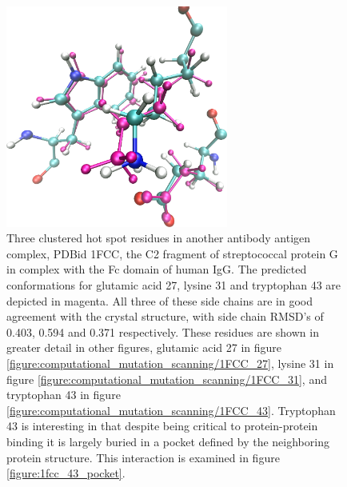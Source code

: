 \begin{figure}[h]
  \centering
  \includegraphics[width=0.65\textwidth,height=0.3\textheight,keepaspectratio]{figures/mutation_side_chain_images/1fcc_27_31_43.png}
  \caption{Three clustered hot spot residues in another antibody antigen complex, PDBid 1FCC, the C2 fragment of streptococcal protein G in complex with the Fc domain of human IgG.
The predicted conformations for glutamic acid 27, lysine 31 and tryptophan 43 are depicted in magenta.
All three of these side chains are in good agreement with the crystal structure, with side chain RMSD's of 0.403, 0.594 and 0.371 respectively.
These residues are shown in greater detail in other figures, glutamic acid 27 in figure \protect\ref{figure:computational_mutation_scanning/1FCC_27}, lysine 31 in figure \protect\ref{figure:computational_mutation_scanning/1FCC_31}, and tryptophan 43 in figure \protect\ref{figure:computational_mutation_scanning/1FCC_43}.
Tryptophan 43 is interesting in that despite being critical to protein-protein binding it is largely buried in a pocket defined by the neighboring protein structure.
This interaction is examined in figure \protect\ref{figure:1fcc_43_pocket}.}
  \label{figure:computational_mutation_scanning/1FCC_27_31_43}
\end{figure}

